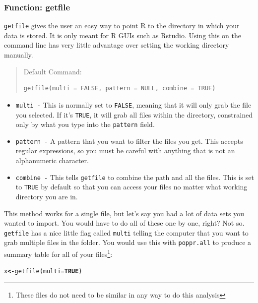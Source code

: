 \documentclass[letterpaper]{article}\usepackage[]{graphicx}\usepackage[]{color}
\makeatletter
\newcommand{\hlnum}[1]{\textcolor[rgb]{0.502,0,0.502}{\textbf{#1}}}%
\newcommand{\hlstd}[1]{\textcolor[rgb]{0,0,0}{#1}}%
\newcommand{\hlkwb}[1]{\textcolor[rgb]{0.502,0.502,0.753}{\textbf{#1}}}%
\newcommand{\hlkwc}[1]{\textcolor[rgb]{0,0.502,0.753}{#1}}%
\newcommand{\hlkwd}[1]{\textcolor[rgb]{0,0.267,0.4}{#1}}%
\newenvironment{kframe}{%
 \def\at@end@of@kframe{}%
 \ifinner\ifhmode%
  \def\at@end@of@kframe{\end{minipage}}%
  \begin{minipage}{\columnwidth}%
 \fi\fi%
 \def\FrameCommand##1{\hskip\@totalleftmargin \hskip-\fboxsep
 \colorbox{shadecolor}{##1}\hskip-\fboxsep
     \hskip-\linewidth \hskip-\@totalleftmargin \hskip\columnwidth}%
 \MakeFramed {\advance\hsize-\width
   \@totalleftmargin\z@ \linewidth\hsize
   \@setminipage}}%
 {\par\unskip\endMakeFramed%
 \at@end@of@kframe}
\newenvironment{knitrout}{}{} %
\newcommand{\tab}{\hspace*{1em}}
\makeatother
\begin{document}
\subsubsection{Function: getfile}\label{intro:import:getfile}
\tab\tab \texttt{getfile} gives the user an easy way to point R to the directory in which your data is stored. It is only meant for R GUIs such as Rstudio. Using this on the command line has very little advantage over setting the working directory manually. 
\begin{quote}
Default Command:
\begin{knitrout}
\color{fgcolor}\begin{kframe}
\begin{verbatim}
getfile(multi = FALSE, pattern = NULL, combine = TRUE)
\end{verbatim}
\end{kframe}
\end{knitrout}

\end{quote}
\begin{itemize}
  \item \texttt{multi -} This is normally set to \texttt{FALSE}, meaning that it will only grab the file you selected. If it's \texttt{TRUE}, it will grab all files within the directory, constrained only by what you type into the \texttt{pattern} field.
  \item \texttt{pattern -} A pattern that you want to filter the files you get. This accepts regular expressions, so you must be careful with anything that is not an alphanumeric character.
  \item \texttt{combine -} This tells \texttt{getfile} to combine the path and all the files. This is set to \texttt{TRUE} by default so that you can access your files no matter what working directory you are in. 
\end{itemize}

This method works for a single file, but let's say you had a lot of data sets you wanted to import. You would have to do all of these one by one, right? Not so. \texttt{getfile} has a nice little flag called \texttt{multi} telling the computer that you want to grab multiple files in the folder. You would use this with \texttt{poppr.all} to produce a summary table for all of your files\footnote{These files do not need to be similar in any way to do this analysis}:
\begin{knitrout}\footnotesize
{}\color{fgcolor}\begin{kframe}
\begin{alltt}
\hlstd{x} \hlkwb{<-} \hlkwd{getfile}\hlstd{(}\hlkwc{multi} \hlstd{=} \hlnum{TRUE}\hlstd{)}
\end{alltt}
\end{kframe}
\end{knitrout}
\end{document}
